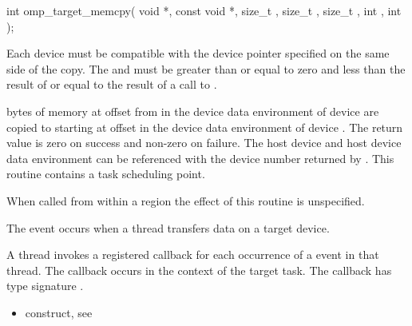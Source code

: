 \begin{ccppspecific}
\begin{figure}[t!]
\end{figure}

\format
\begin{ompcFunction}
int omp_target_memcpy(
  void *,
  const void *,
  size_t ,
  size_t ,
  size_t ,
  int ,
  int 
);
\end{ompcFunction}

\constraints
Each device must
be compatible with the device pointer specified on the same side of the copy.
The  and 
must be greater than or equal to zero and less than the result of
 or equal to the result of a call to
.

\effect


 bytes of memory at offset  from  
in the device data environment of device  are
copied to  starting at offset  in the device data
environment of device .  
The return value is zero on success and non-zero on failure.  The host device
and host device data environment can be referenced with the device number
returned by . This routine contains a task
scheduling point.

When called from within a  region 
the effect of this routine is unspecified.

\events
The  event occurs when a thread transfers data on a target device.

\begin{figure}[t!]
\end{figure}

\tools
A thread invokes a registered 
callback for each occurrence of a  event in that thread. 
The callback occurs in the context of the target task.  The callback has type signature
. 


\crossreferences
\begin{itemize}
\item {} construct, see 


\end{itemize}
\end{ccppspecific}
